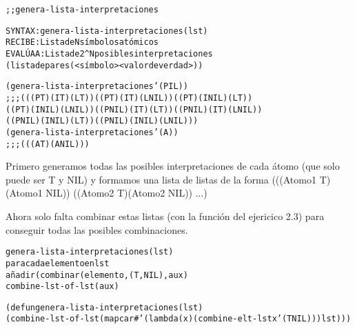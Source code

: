 \begin{aibox}{\function}
\begin{alltt}
;; genera-lista-interpretaciones

SYNTAX: genera-lista-interpretaciones (lst) 
RECIBE   : Lista de N símbolos atómicos
EVALÚA A : Lista de 2^N posibles interpretaciones
             (lista de pares (<símbolo> <valor de verdad>))

\end{alltt}
\end{aibox}

\begin{aibox}{\examples}
\begin{alltt}
(genera-lista-interpretaciones '(P I L))
;;; (((P T) (I T) (L T)) ((P T) (I T) (L NIL)) ((P T) (I NIL) (L T))
 ((P T) (I NIL) (L NIL)) ((P NIL) (I T) (L T)) ((P NIL) (I T) (L NIL))
 ((P NIL) (I NIL) (L T)) ((P NIL) (I NIL) (L NIL)))
 (genera-lista-interpretaciones '(A))
;;; (((A T) (A NIL)))
\end{alltt}

\end{aibox}

\begin{aibox}{\comments}
Primero generamos todas las posibles interpretaciones de cada átomo (que solo puede ser T y NIL) y formamos una lista de listas de la forma (((Atomo1 T) (Atomo1 NIL)) ((Atomo2 T)(Atomo2 NIL)) ...)

Ahora solo falta combinar estas listas (con la función del ejericico 2.3) para conseguir todas las posibles combinaciones.
\end{aibox}

\begin{aibox}{\pseudocode}
\begin{alltt}
genera-lista-interpretaciones (lst)
    para cada elemento en lst
        añadir ( combinar(elemento, (T, NIL), aux)
    combine-lst-of-lst (aux)
\end{alltt}
\end{aibox}
\begin{aibox}{\code}

\begin{alltt}
(defun genera-lista-interpretaciones (lst) 
    (combine-lst-of-lst (mapcar #'(lambda (x) (combine-elt-lst x '(T NIL))) lst)))
\end{alltt}
\end{aibox}
